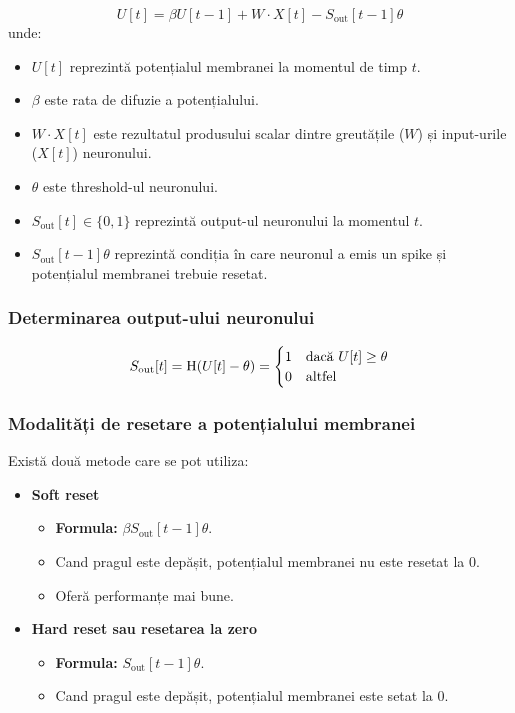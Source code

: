 \begin{equation}
\label{eq:formulaPotentialulMembranei}
U[t] = \beta U[t - 1] + W \cdot X[t] - S_{\text{out}}[t - 1]\theta
\end{equation}
unde:
\begin{itemize}
    \item \( U[t] \) reprezintă potențialul membranei la momentul de timp \( t \).
    \item \( \beta \) este rata de difuzie a potențialului.
    \item \( W \cdot X[t] \) este rezultatul produsului scalar dintre greutățile (\( W \)) și input-urile (\( X[t] \)) neuronului.
    \item \( \theta \) este threshold-ul neuronului.
    \item \( S_{\text{out}}[t] \in \{0, 1\} \) reprezintă output-ul neuronului la momentul \( t \).
    \item \( S_{\text{out}}[t - 1]\theta \) reprezintă condiția în care neuronul a emis un spike și potențialul membranei trebuie resetat.
\end{itemize}


\subsubsection{Determinarea output-ului neuronului}

\begin{equation}
\label{eq:outputNeuronLIF}
S_{\text{out}}[t] = \\
\text{H}(U[t] - \theta) = \begin{cases} 
1 & \text{dacă } U[t] \geq \theta \\
0 & \text{altfel}
\end{cases}
\end{equation}


\subsubsection{Modalități de resetare a potențialului membranei}

Există două metode care se pot utiliza:
\begin{itemize}
    \item \textbf{Soft reset} 
    \begin{itemize}
        \item \textbf{Formula:} \(\beta S_{\text{out}}[t - 1]\theta\).
        \item Cand pragul este depășit, potențialul membranei nu este resetat la 0.
        \item Oferă performanțe mai bune.
    \end{itemize}
    \item \textbf{Hard reset sau resetarea la zero}
    \begin{itemize}
        \item \textbf{Formula:} \(S_{\text{out}}[t - 1]\theta\).
        \item Cand pragul este depășit, potențialul membranei este setat la 0.
    \end{itemize}
\end{itemize}

